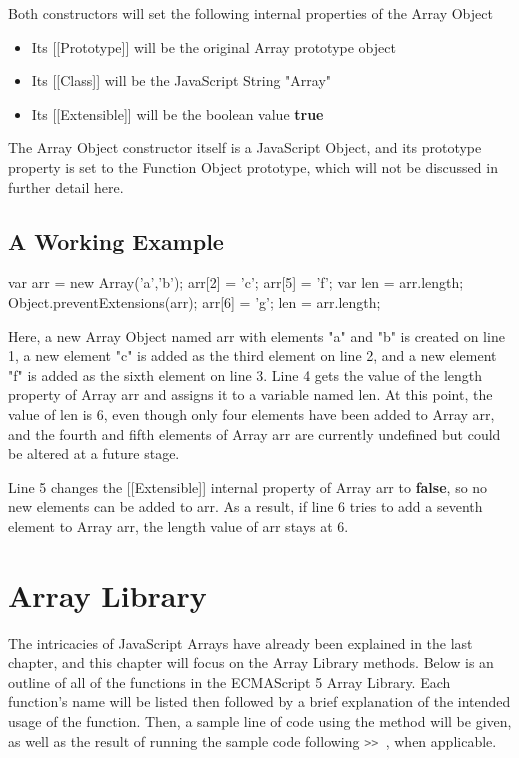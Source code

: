 \documentclass[a4paper,11pt,twoside]{report}
\def\jsinline{\lstinline[language=JavaScript, basicstyle=\small]}
\begin{document}
Both constructors will set the following internal properties of the Array Object
\begin{itemize}
\item Its [[Prototype]] will be the original Array prototype object
\item Its [[Class]] will be the JavaScript String "Array"
\item Its [[Extensible]] will be the boolean value \textbf{true}
\end{itemize}

The Array Object constructor itself is a JavaScript Object, and its prototype property is set to the Function Object prototype, which will not be discussed in further detail here.

\section{A Working Example}
\begin{adjustwidth}{4cm}{4cm}
\begin{lstjs}
var arr = new Array('a','b');
arr[2] = 'c';
arr[5] = 'f';
var len = arr.length;
Object.preventExtensions(arr);
arr[6] = 'g';
len = arr.length;
\end{lstjs}
\end{adjustwidth}

Here, a new Array Object named arr with elements "a" and "b" is created on line 1, a new element "c" is added as the third element on line 2, and a new element "f" is added as the sixth element on line 3. Line 4 gets the value of the length property of Array arr and assigns it to a variable named len. At this point, the value of len is 6, even though only four elements have been added to Array arr, and the fourth and fifth elements of Array arr are currently undefined but could be altered at a future stage.

Line 5 changes the [[Extensible]] internal property of Array arr to \textbf{false}, so no new elements can be added to arr. As a result, if line 6 tries to add a seventh element to Array arr, the length value of arr stays at 6.


\chapter{Array Library}
The intricacies of JavaScript Arrays have already been explained in the last chapter, and this chapter will focus on the Array Library methods. Below is an outline of all of the functions in the ECMAScript 5 Array Library. Each function's name will be listed then followed by a brief explanation of the intended usage of the function. Then, a sample line of code using the method will be given, as well as the result of running the sample code following \jsinline|>> |, when applicable.
\end{document}

